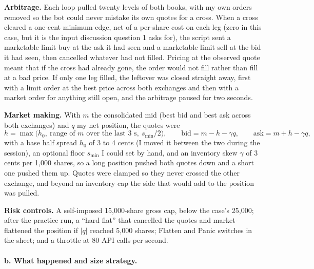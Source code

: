 \textbf{Arbitrage.} Each loop pulled twenty levels of both books, with my own orders
removed so the bot could never mistake its own quotes for a cross. When a cross
cleared a one-cent minimum edge, net of a per-share cost on each leg (zero in this
case, but it is the input discussion question 1 asks for), the script sent a
marketable limit buy at the ask it had seen and a marketable limit sell at the bid it
had seen, then cancelled whatever had not filled. Pricing at the observed quote meant
that if the cross had already gone, the order would not fill rather than fill at a
bad price. If only one leg filled, the leftover was closed straight away, first with
a limit order at the best price across both exchanges and then with a market order
for anything still open, and the arbitrage paused for two seconds.

\textbf{Market making.} With $m$ the consolidated mid (best bid and best ask across
both exchanges) and $q$ my net position, the quotes were
\begin{equation*}
h=\max\bigl(h_0,\ \text{range of } m \text{ over the last 3 s},\ s_{\min}/2\bigr),\qquad
\text{bid}=m-h-\gamma q,\qquad \text{ask}=m+h-\gamma q,
\end{equation*}
with a base half spread $h_0$ of 3 to 4 cents (I moved it between the two during the
session), an optional floor $s_{\min}$ I could set by hand, and an inventory skew
$\gamma$ of 3 cents per 1{,}000 shares, so a long position pushed both quotes down
and a short one pushed them up. Quotes were clamped so they never crossed the other
exchange, and beyond an inventory cap the side that would add to the position was
pulled.

\textbf{Risk controls.} A self-imposed 15{,}000-share gross cap, below the case's
25{,}000; after the practice run, a ``hard flat'' that cancelled the quotes and
market-flattened the position if $|q|$ reached 5{,}000 shares; Flatten and Panic
switches in the sheet; and a throttle at 80 API calls per second.

\paragraph{b. What happened and size strategy.}

